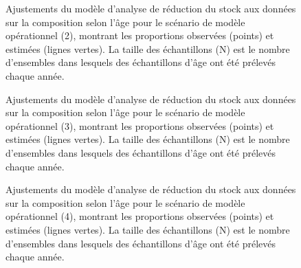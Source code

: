 \documentclass[french,11pt]{book}
\begin{document}
\begin{figure}[htb]

{\centering {} 

}

\caption{Ajustements du modèle d'analyse de réduction du stock aux données sur la composition selon l'âge pour le scénario de modèle opérationnel (2), montrant les proportions observées (points) et estimées (lignes vertes). La taille des échantillons (N) est le nombre d'ensembles dans lesquels des échantillons d'âge ont été prélevés chaque année.}\label{fig:sra-conditioned-comp-fit2}
\end{figure}
\clearpage


\begin{figure}[htb]

{\centering {} 

}

\caption{Ajustements du modèle d'analyse de réduction du stock aux données sur la composition selon l'âge pour le scénario de modèle opérationnel (3), montrant les proportions observées (points) et estimées (lignes vertes). La taille des échantillons (N) est le nombre d'ensembles dans lesquels des échantillons d'âge ont été prélevés chaque année.}\label{fig:sra-conditioned-comp-fit3}
\end{figure}
\clearpage


\begin{figure}[htb]

{\centering {} 

}

\caption{Ajustements du modèle d'analyse de réduction du stock aux données sur la composition selon l'âge pour le scénario de modèle opérationnel (4), montrant les proportions observées (points) et estimées (lignes vertes). La taille des échantillons (N) est le nombre d'ensembles dans lesquels des échantillons d'âge ont été prélevés chaque année.}\label{fig:sra-conditioned-comp-fit4}
\end{figure}
\clearpage
\end{document}
